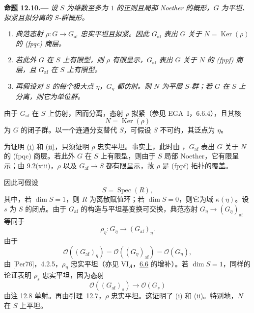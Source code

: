 \medskip
{}\label{prop:sga3-VIB-12.10}%
\noindent\textbf{命题 12.10.---}
\emph{设 \(S\) 为维数至多为 \(1\) 的正则且局部 Noether 的概形，\(G\) 为平坦、拟紧且拟分离的 \(S\)-群概形。}
\begin{enumerate}
\item[\textup{(i)}]\label{prop:sga3-VIB-12.10-i}%
  \emph{典范态射 \(\rho:G\to G_{\mathrm{af}}\) 忠实平坦且拟紧。因此 \(G_{\mathrm{af}}\) 表出 \(G\) 关于 \(N=\operatorname{Ker}(\rho)\) 的 \textup{(fpqc)} 商层。}

\item[\textup{(ii)}]\label{prop:sga3-VIB-12.10-ii}%
  \emph{若此外 \(G\) 在 \(S\) 上有限型，则 \(\rho\) 有限呈示，\(G_{\mathrm{af}}\) 表出 \(G\) 关于 \(N\) 的 \textup{(fppf)} 商层，且 \(G_{\mathrm{af}}\) 在 \(S\) 上有限型。}

\item[\textup{(iii)}]\label{prop:sga3-VIB-12.10-iii}%
  \emph{再假设对 \(S\) 的每个极大点 \(\eta\)，\(G_\eta\) 都仿射。则 \(N\) 为平展 \(S\)-群；若 \(G\) 在 \(S\) 上分离，则它为单位群。}
\end{enumerate}

由于 \(G_{\mathrm{af}}\) 在 \(S\) 上仿射，因而分离，态射 \(\rho\) 拟紧\textup{（参见 EGA~I，6.6.4）}，且其核
\[
  N=\operatorname{Ker}(\rho)
\]
为 \(G\) 的闭子群。以一个连通分支替代 \(S\)，可假设 \(S\) 不可约，其泛点为 \(\eta\)。

为证明 \hyperref[prop:sga3-VIB-12.10-i]{\textup{(i)}} 和 \hyperref[prop:sga3-VIB-12.10-ii]{\textup{(ii)}}，只须证明 \(\rho\) 忠实平坦。事实上，此时由 ，\(G_{\mathrm{af}}\) 表出 \(G\) 关于 \(N\) 的 \textup{(fpqc)} 商层。若此外 \(G\) 在 \(S\) 上有限型，则由于 \(S\) 局部 Noether，它有限呈示；由 \hyperref[prop:sga3-VIB-9.2]{9.2\textup{(xiii)}}，\(\rho\) 以及 \(G_{\mathrm{af}}\to S\) 都有限呈示，故 \(\rho\) 是 \textup{(fppf)} 拓扑的覆盖。

因此可假设
\[
  S=\operatorname{Spec}(R),
\]
其中，若 \(\dim S=1\)，则 \(R\) 为离散赋值环；若 \(\dim S=0\)，则它为域 \(\kappa(\eta)\)。设 \(s\) 为 \(S\) 的闭点。由于 \(G_{\mathrm{af}}\) 的构造与平坦基变换可交换，典范态射 \(G_\eta\to(G_\eta)_{\mathrm{af}}\) 等同于
\[
  \rho_\eta:G_\eta\longrightarrow(G_{\mathrm{af}})_\eta.
\]
由于
\[
  \mathcal O((G_{\mathrm{af}})_\eta)
    =\mathcal O((G_\eta)_{\mathrm{af}})
    =\mathcal O(G_\eta),
\]
由 \textup{[Per76]}，4.2.5，\(\rho_\eta\) 忠实平坦\textup{（亦见 VI\(_A\)，\hyperref[cor:sga3-VIA-6.6]{6.6} 的增补）}。若 \(\dim S=1\)，同样的论证表明 \(\rho_s\) 忠实平坦，因为态射
\[
  \mathcal O((G_{\mathrm{af}})_s)
    \longrightarrow\mathcal O(G_s)
\]
由\hyperref[rem:sga3-VIB-12.8]{注 12.8} 单射。再由引理~\hyperref[lem:sga3-VIB-12.7]{12.7}，\(\rho\) 忠实平坦。这证明了 \hyperref[prop:sga3-VIB-12.10-i]{\textup{(i)}} 和 \hyperref[prop:sga3-VIB-12.10-ii]{\textup{(ii)}}。特别地，\(N\) 在 \(S\) 上平坦。

